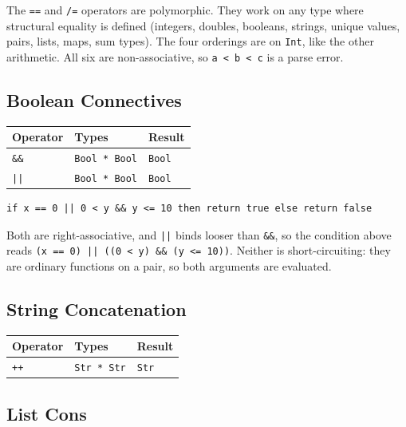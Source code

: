 \documentclass[11pt,a4paper]{article}
\newcommand{\cba}[1]{\lstinline[style=cbainline]{#1}}
\begin{document}
The \texttt{==} and \texttt{/=} operators are polymorphic. They work on any
type where structural equality is defined (integers, doubles, booleans,
strings, unique values, pairs, lists, maps, sum types).  The four orderings
are on \texttt{Int}, like the other arithmetic.  All six are
non-associative, so \texttt{a < b < c} is a parse error.

\subsection{Boolean Connectives}

\begin{center}
\begin{tabular}{lll}
\toprule
\textbf{Operator} & \textbf{Types} & \textbf{Result} \\
\midrule
\texttt{\&\&} & \texttt{Bool * Bool} & \texttt{Bool} \\
\texttt{||}   & \texttt{Bool * Bool} & \texttt{Bool} \\
\bottomrule
\end{tabular}
\end{center}

\begin{lstlisting}
if x == 0 || 0 < y && y <= 10 then return true else return false
\end{lstlisting}

Both are right-associative, and \cba{||} binds looser than \cba{&&}, so the
condition above reads \cba{(x == 0) || ((0 < y) && (y <= 10))}.  Neither is
short-circuiting: they are ordinary functions on a pair, so both arguments
are evaluated.

\subsection{String Concatenation}

\begin{center}
\begin{tabular}{lll}
\toprule
\textbf{Operator} & \textbf{Types} & \textbf{Result} \\
\midrule
\texttt{++} & \texttt{Str * Str} & \texttt{Str} \\
\bottomrule
\end{tabular}
\end{center}

\subsection{List Cons}
\end{document}
